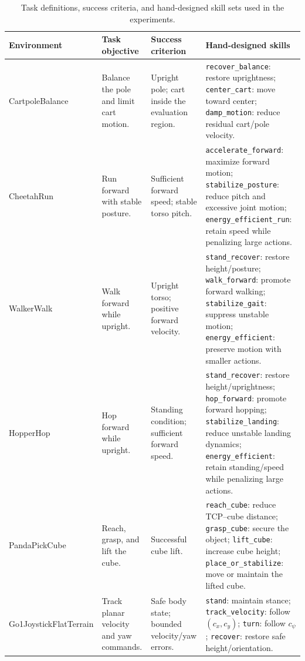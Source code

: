 \documentclass[conference,letterpaper,10pt]{IEEEtran}
\begin{document}
\begin{table}[!t]
\caption{Task definitions, success criteria, and hand-designed skill sets used in the experiments.}
\label{tab:envskills}
\centering
\footnotesize
\setlength{\tabcolsep}{4pt}
\renewcommand{\arraystretch}{1.12}
\begin{tabularx}{\textwidth}{@{}p{}p{}p{}Y@{}}
\toprule
Environment & Task objective & Success criterion & Hand-designed skills\\
\midrule

CartpoleBalance &
Balance the pole and limit cart motion. &
Upright pole; cart inside the evaluation region. &
\texttt{recover\_balance}: restore uprightness;
\texttt{center\_cart}: move toward center;
\texttt{damp\_motion}: reduce residual cart/pole velocity.\\

\addlinespace

CheetahRun &
Run forward with stable posture. &
Sufficient forward speed; stable torso pitch. &
\texttt{accelerate\_forward}: maximize forward motion;
\texttt{stabilize\_posture}: reduce pitch and excessive joint motion;
\texttt{energy\_efficient\_run}: retain speed while penalizing large actions.\\

\addlinespace

WalkerWalk &
Walk forward while upright. &
Upright torso; positive forward velocity. &
\texttt{stand\_recover}: restore height/posture;
\texttt{walk\_forward}: promote forward walking;
\texttt{stabilize\_gait}: suppress unstable motion;
\texttt{energy\_efficient}: preserve motion with smaller actions.\\

\addlinespace

HopperHop &
Hop forward while upright. &
Standing condition; sufficient forward speed. &
\texttt{stand\_recover}: restore height/uprightness;
\texttt{hop\_forward}: promote forward hopping;
\texttt{stabilize\_landing}: reduce unstable landing dynamics;
\texttt{energy\_efficient}: retain standing/speed while penalizing large actions.\\

\addlinespace

PandaPickCube &
Reach, grasp, and lift the cube. &
Successful cube lift. &
\texttt{reach\_cube}: reduce TCP--cube distance;
\texttt{grasp\_cube}: secure the object;
\texttt{lift\_cube}: increase cube height;
\texttt{place\_or\_stabilize}: move or maintain the lifted cube.\\

\addlinespace

Go1Joystick\newline FlatTerrain &
Track planar velocity and yaw commands. &
Safe body state; bounded velocity/yaw errors. &
\texttt{stand}: maintain stance;
\texttt{track\_velocity}: follow $(c_x,c_y)$;
\texttt{turn}: follow $c_\psi$;
\texttt{recover}: restore safe height/orientation.\\

\bottomrule
\end{tabularx}
\end{table}
\end{document}
